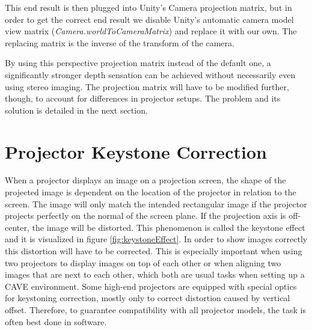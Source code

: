 \documentclass[12pt,a4paper,oneside,pdftex]{report}
\begin{document}
This end result is then plugged into Unity's Camera projection matrix, but in order to get the correct end result we disable Unity's automatic camera model view matrix (\emph{Camera.worldToCameraMatrix}) and replace it with our own. The replacing matrix is the inverse of the transform of the camera.

By using this perspective projection matrix instead of the default one, a significantly stronger depth sensation can be achieved without necessarily even using stereo imaging. The projection matrix will have to be modified further, though, to account for differences in projector setups. The problem and its solution is detailed in the next section.

\section{Projector Keystone Correction}
\label{section:keystonecorrection}

When a projector displays an image on a projection screen, the shape of the projected image is dependent on the location of the projector in relation to the screen. The image will only match the intended rectangular image if the projector projects perfectly on the normal of the screen plane. If the projection axis is off-center, the image will be distorted. This phenomenon is called the keystone effect and it is visualized in figure \ref{fig:keystoneEffect}. In order to show images correctly this distortion will have to be corrected. This is especially important when using two projectors to display images on top of each other or when aligning two images that are next to each other, which both are usual tasks when setting up a CAVE environment. Some high-end projectors are equipped with special optics for keystoning correction, mostly only to correct distortion caused by vertical offset. Therefore, to guarantee compatibility with all projector models, the task is often best done in software.
\end{document}
